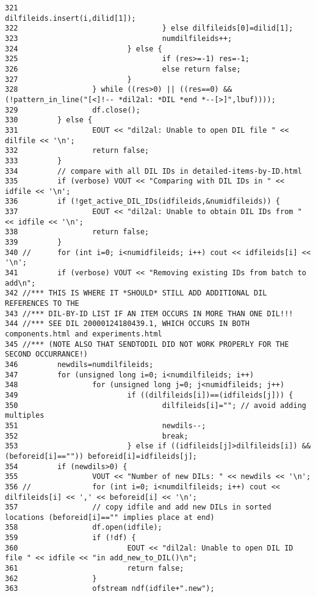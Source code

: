 \begin{verbatim}
321                                         dilfileids.insert(i,dilid[1]);
322                                 } else dilfileids[0]=dilid[1];
323                                 numdilfileids++;
324                         } else {
325                                 if (res>=-1) res=-1;
326                                 else return false;
327                         }
328                 } while ((res>0) || ((res==0) && (!pattern_in_line("[<]!-- *dil2al: *DIL *end *--[>]",lbuf))));
329                 df.close();
330         } else {
331                 EOUT << "dil2al: Unable to open DIL file " << dilfile << '\n';
332                 return false;
333         }
334         // compare with all DIL IDs in detailed-items-by-ID.html
335         if (verbose) VOUT << "Comparing with DIL IDs in " << idfile << '\n';
336         if (!get_active_DIL_IDs(idfileids,&numidfileids)) {
337                 EOUT << "dil2al: Unable to obtain DIL IDs from " << idfile << '\n';
338                 return false;
339         }
340 //      for (int i=0; i<numidfileids; i++) cout << idfileids[i] << '\n';
341         if (verbose) VOUT << "Removing existing IDs from batch to add\n";
342 //*** THIS IS WHERE IT *SHOULD* STILL ADD ADDITIONAL DIL REFERENCES TO THE
343 //*** DIL-BY-ID LIST IF AN ITEM OCCURS IN MORE THAN ONE DIL!!!
344 //*** SEE DIL 20000124180439.1, WHICH OCCURS IN BOTH components.html and experiments.html
345 //*** (NOTE ALSO THAT SENDTODIL DID NOT WORK PROPERLY FOR THE SECOND OCCURRANCE!)
346         newdils=numdilfileids;
347         for (unsigned long i=0; i<numdilfileids; i++)
348                 for (unsigned long j=0; j<numidfileids; j++)
349                         if ((dilfileids[i])==(idfileids[j])) {
350                                 dilfileids[i]=""; // avoid adding multiples
351                                 newdils--;
352                                 break;
353                         } else if ((idfileids[j]>dilfileids[i]) && (beforeid[i]=="")) beforeid[i]=idfileids[j];
354         if (newdils>0) {
355                 VOUT << "Number of new DILs: " << newdils << '\n';
356 //              for (int i=0; i<numdilfileids; i++) cout << dilfileids[i] << ',' << beforeid[i] << '\n';
357                 // copy idfile and add new DILs in sorted locations (beforeid[i]=="" implies place at end)
358                 df.open(idfile);
359                 if (!df) {
360                         EOUT << "dil2al: Unable to open DIL ID file " << idfile << "in add_new_to_DIL()\n";
361                         return false;
362                 }
363                 ofstream ndf(idfile+".new");

\end{verbatim}
